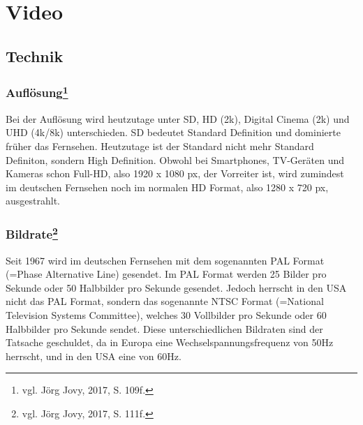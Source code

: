 \chapter{Video}
\renewcommand{\kapitelautor}{Autor: Kerstin Schön}
\section{Technik}
\subsection[Auflösung]{Auflösung\protect\footnote{\label{}vgl. Jörg Jovy, 2017, S. 109f.}}
Bei der Auflösung wird heutzutage unter SD, HD (2k), Digital Cinema (2k) und UHD (4k/8k) unterschieden. SD bedeutet Standard Definition und dominierte früher das Fernsehen. Heutzutage ist der Standard nicht mehr Standard Definiton, sondern High Definition. Obwohl bei Smartphones, TV-Geräten und Kameras schon Full-HD, also 1920 x 1080 px, der Vorreiter ist, wird zumindest im deutschen Fernsehen noch im normalen HD Format, also 1280 x 720 px, ausgestrahlt. 
\subsection[Bildrate]{Bildrate\protect\footnote{\label{}vgl. Jörg Jovy, 2017, S. 111f.}}
Seit 1967 wird im deutschen Fernsehen mit dem sogenannten PAL Format (=Phase Alternative Line) gesendet. Im PAL Format werden 25 Bilder pro Sekunde oder 50 Halbbilder pro Sekunde gesendet. Jedoch herrscht in den USA nicht das PAL Format, sondern das sogenannte NTSC Format (=National Television Systems Committee), welches 30 Vollbilder pro Sekunde oder 60 Halbbilder pro Sekunde sendet. Diese unterschiedlichen Bildraten sind der Tatsache geschuldet, da in Europa eine Wechselspannungsfrequenz von 50Hz herrscht, und in den USA eine von 60Hz.
